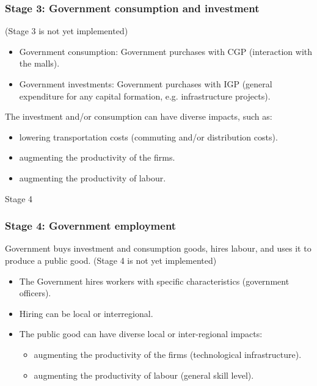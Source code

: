 \documentclass{beamer}
\begin{document}
\begin{frame}{}
\frametitle{Stage 3: Government consumption and investment}
(Stage 3 is not yet implemented)
\begin{itemize}
\item Government consumption: Government purchases with CGP (interaction
with the malls).
\item Government investments: Government purchases with IGP (general
expenditure for any capital formation, e.g. infrastructure projects).
\end{itemize}

The investment and/or consumption can have diverse impacts, such as:
\begin{itemize}
\item lowering transportation costs (commuting and/or distribution costs).
\item augmenting the productivity of the firms.
\item augmenting the productivity of labour.
\end{itemize}
\end{frame}

\begin{frame}{Stage 4}
\frametitle{Stage 4: Government employment}
Government buys investment and consumption goods, hires labour, and uses it to produce a public good.
(Stage 4 is not yet implemented)

\begin{itemize}
\item The Government hires workers with specific characteristics (government officers).
\item Hiring can be local or interregional.
\item The public good can have diverse local or inter-regional impacts:
    \begin{itemize}
    \item augmenting the productivity of the firms (technological infrastructure).
    \item augmenting the productivity of labour (general skill level).
    \end{itemize}
\end{itemize}
\end{frame}
\end{document}
